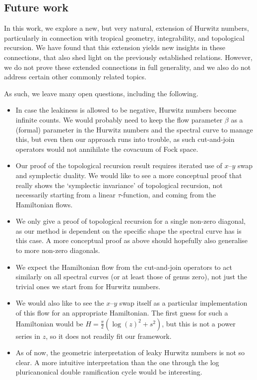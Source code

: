 \documentclass[10pt,a4paper,oneside,no-math,reqno]{amsart}%
\theoremstyle{plain}
\theoremstyle{definition}
\theoremstyle{remark}
\numberwithin{equation}{section}
\newcommand{\1}{\mathds{1}}
\newcommand{\<}{\langle}
\renewcommand{\>}{\rangle}
\begin{document}
\subsection{Future work}

In this work, we explore a new, but very natural, extension of Hurwitz numbers, particularly in connection with tropical geometry, integrability, and topological recursion. We have found that this extension yields new insights in these connections, that also shed light on the previously established relations. However, we do not prove these extended connections in full generality, and we also do not address certain other commonly related topics.

As such, we leave many open questions, including the following.

\begin{itemize}
    \item In case the leakiness is allowed to be negative, Hurwitz numbers become infinite counts. We would probably need to keep the flow parameter $ \beta$ as a (formal) parameter in the Hurwitz numbers and the spectral curve to manage this, but even then our approach runs into trouble, as such cut-and-join operators would not annihilate the covacuum of Fock space.
    \item Our proof of the topological recursion result requires iterated use of $ x$--$y$ swap and symplectic duality. We would like to see a more conceptual proof that really shows the `symplectic invariance' of topological recursion, not necessarily starting from a linear $ \tau$-function, and coming from the Hamiltonian flows.
    \item We only give a proof of topological recursion for a single non-zero diagonal, as our method is dependent on the specific shape the spectral curve has is this case. A more conceptual proof as above should hopefully also generalise to more non-zero diagonals.
    \item We expect the Hamiltonian flow from the cut-and-join operators to act similarly on all spectral curves (or at least those of genus zero), not just the trivial ones we start from for Hurwitz numbers.
    \item We would also like to see the $x$--$y$ swap itself as a particular implementation of this flow for an appropriate Hamiltonian. The first guess for such a Hamiltonian would be $ H = \frac{\pi}{2} ( \log(z)^2 + s^2 )$, but this is not a power series in $z$, so it does not readily fit our framework.
    \item As of now, the geometric interpretation of leaky Hurwitz numbers is not so clear. A more intuitive interpretation than the one through the log pluricanonical double ramification cycle would be interesting.

\end{itemize}
\end{document}
